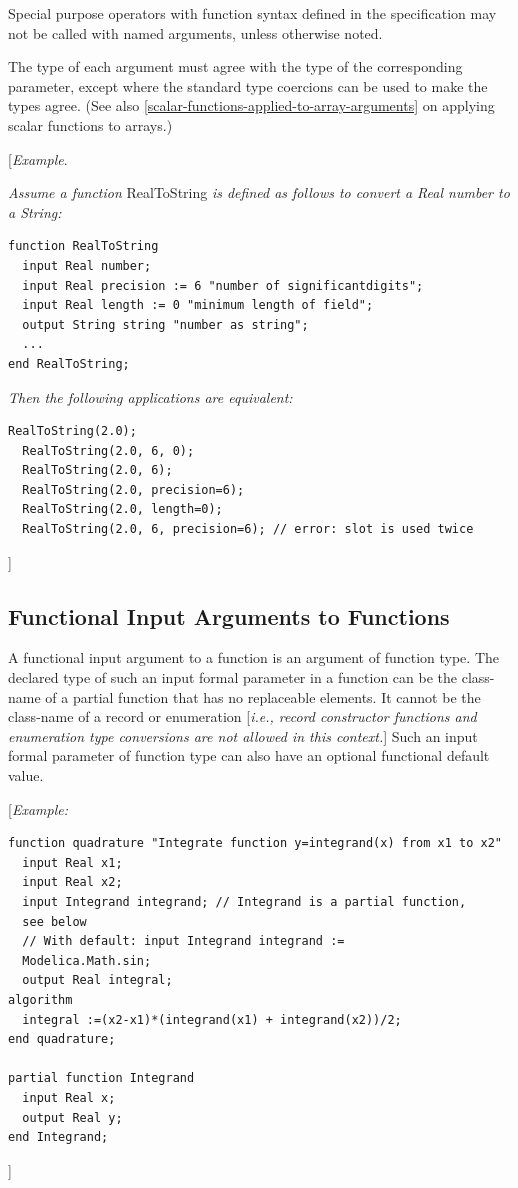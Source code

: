 \documentclass[10pt,a4paper]{report}
\def\doublelabel#1{\label{#1}\hypertarget{#1}{}}
\begin{document}
Special purpose operators with function syntax defined in the
specification may not be called with named arguments, unless otherwise
noted.

The type of each argument must agree with the type of the corresponding
parameter, except where the standard type coercions can be used to make
the types agree. (See also \ref{scalar-functions-applied-to-array-arguments} on applying scalar functions
to arrays.)

{[}\emph{Example}.

\emph{Assume a function} RealToString \emph{is defined as follows to
convert a Real number to a String:}

\begin{lstlisting}[language=modelica]
function RealToString
  input Real number;
  input Real precision := 6 "number of significantdigits";
  input Real length := 0 "minimum length of field";
  output String string "number as string";
  ...
end RealToString;
\end{lstlisting}
\emph{Then the following applications are equivalent:}

\begin{lstlisting}[language=modelica]
  RealToString(2.0);
  RealToString(2.0, 6, 0);
  RealToString(2.0, 6);
  RealToString(2.0, precision=6);
  RealToString(2.0, length=0);
  RealToString(2.0, 6, precision=6); // error: slot is used twice
\end{lstlisting}
{]}

\subsection{Functional Input Arguments to Functions}\doublelabel{functional-input-arguments-to-functions}

A functional input argument to a function is an argument of function
type. The declared type of such an input formal parameter in a function
can be the class-name of a partial function that has no replaceable
elements. It cannot be the class-name of a record or enumeration
{[}\emph{i.e., record constructor functions and enumeration type
conversions are not allowed in this context.}{]} Such an input formal
parameter of function type can also have an optional functional default
value.

{[}\emph{Example:}

\begin{lstlisting}[language=modelica]
  function quadrature "Integrate function y=integrand(x) from x1 to x2"
  input Real x1;
  input Real x2;
  input Integrand integrand; // Integrand is a partial function,
  see below
  // With default: input Integrand integrand :=
  Modelica.Math.sin;
  output Real integral;
algorithm
  integral :=(x2-x1)*(integrand(x1) + integrand(x2))/2;
end quadrature;

partial function Integrand
  input Real x;
  output Real y;
end Integrand;
\end{lstlisting}
{]}
\end{document}
